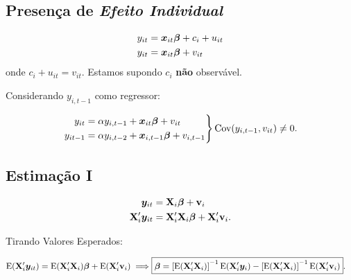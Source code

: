 \documentclass[11pt, oneside, a4paper, article]{article}
\numberwithin{equation}{section}
\begin{document}
\subsection{Presença de \textit{Efeito Individual}}

\vspace{-2 em}
\begin{align*}
	y_{it} &= \boldsymbol{x}_{it} \boldsymbol{\beta} + c_{i} + u_{it} 
	\\
	y_{it} &= \boldsymbol{x}_{it} \boldsymbol{\beta} + v_{it}
\end{align*}
onde $c_{i} + u_{it} = v_{it}$.
Estamos supondo $c_{i}$ \textbf{não} observável.

Considerando $y_{i, t-1}$ como regressor:

\vspace{-2 em}
\begin{align*}
\left.
\begin{aligned}
	y_{it} &= \alpha y_{i, t-1} + \boldsymbol{x}_{it} \boldsymbol{\beta} + v_{it}
	\\
	y_{it-1} &= \alpha y_{i, t-2} + \boldsymbol{x}_{i,t-1} \boldsymbol{\beta} + v_{i,t-1}
\end{aligned}
\right\}
\text{Cov}(y_{i, t-1}, v_{it}) \neq 0.
\end{align*}

\subsection{Estimação I}

\begin{center}
\end{center}

\vspace{-2 em}
\begin{align*}
	\boldsymbol{y}_{it} &= \mathbf{X}_{i} \boldsymbol{\beta} + \mathbf{v}_{i}
	\\
	\mathbf{X}_{i}' \boldsymbol{y}_{it} &= \mathbf{X}_{i}' \mathbf{X}_{i} \boldsymbol{\beta} + \mathbf{X}_{i}' \mathbf{v}_{i}.
\end{align*}

\noindent
Tirando Valores Esperados:

\vspace{-1 em}
\begin{align*}
\E( \Xmat_{i}' \yvec_{it} )
=
\E( \Xmat_{i}' \Xmat_{i} ) \betavec + \E( \Xmat_{i}' \vvec_{i} )
\implies
\Aboxed{
\betavec
=
\left[ \E( \Xmat_{i}' \Xmat_{i} ) \right]^{-1}
\E( \Xmat_{i}' \yvec_{i} )  - 
\left[ \E( \Xmat_{i}' \Xmat_{i} ) \right]^{-1}
\E( \Xmat_{i}' \vvec_{i} )
}.
\end{align*}
\end{document}
